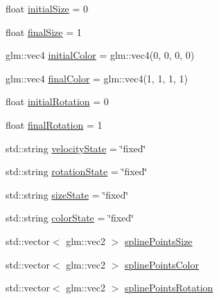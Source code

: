 \begin{DoxyCompactItemize}
float \hyperlink{class_mason_1_1_particle_descriptor_aebf2ee5b2a1b72e03e010d66a1ccf054}{initial\+Size} = 0
\item 
float \hyperlink{class_mason_1_1_particle_descriptor_ad865ce5734085951e7c1ec384389ca4b}{final\+Size} = 1
\item 
glm\+::vec4 \hyperlink{class_mason_1_1_particle_descriptor_a458d7ca5c19a0bbcf1c73796dbaf3597}{initial\+Color} = glm\+::vec4(0, 0, 0, 0)
\item 
glm\+::vec4 \hyperlink{class_mason_1_1_particle_descriptor_a2b01be3725b46d1f4ef7a6775347be66}{final\+Color} = glm\+::vec4(1, 1, 1, 1)
\item 
float \hyperlink{class_mason_1_1_particle_descriptor_a24f23bf106c1d0bf7dc676d16d64c6d7}{initial\+Rotation} = 0
\item 
float \hyperlink{class_mason_1_1_particle_descriptor_ac588e3cd99709ae248547649b4a6643b}{final\+Rotation} = 1
\item 
std\+::string \hyperlink{class_mason_1_1_particle_descriptor_ac84b802189304538944403fdff16faf2}{velocity\+State} = \char`\"{}fixed\char`\"{}
\item 
std\+::string \hyperlink{class_mason_1_1_particle_descriptor_ac192d2da527967c55804632bc6c0ca9e}{rotation\+State} = \char`\"{}fixed\char`\"{}
\item 
std\+::string \hyperlink{class_mason_1_1_particle_descriptor_a67edecae2a5df1c28ccc2f7cdb0a615f}{size\+State} = \char`\"{}fixed\char`\"{}
\item 
std\+::string \hyperlink{class_mason_1_1_particle_descriptor_aea9d3bf8cd0eaf89a9d34ca698062280}{color\+State} = \char`\"{}fixed\char`\"{}
\item 
std\+::vector$<$ glm\+::vec2 $>$ \hyperlink{class_mason_1_1_particle_descriptor_aefa11cd147ec20d3084c661245abb49c}{spline\+Points\+Size}
\item 
std\+::vector$<$ glm\+::vec2 $>$ \hyperlink{class_mason_1_1_particle_descriptor_a3a7588bd840bc8010f23bda75ec56e5d}{spline\+Points\+Color}
\item 
std\+::vector$<$ glm\+::vec2 $>$ \hyperlink{class_mason_1_1_particle_descriptor_aad86105e768cb5cf59c26d1277ccad2e}{spline\+Points\+Rotation}
\end{DoxyCompactItemize}


